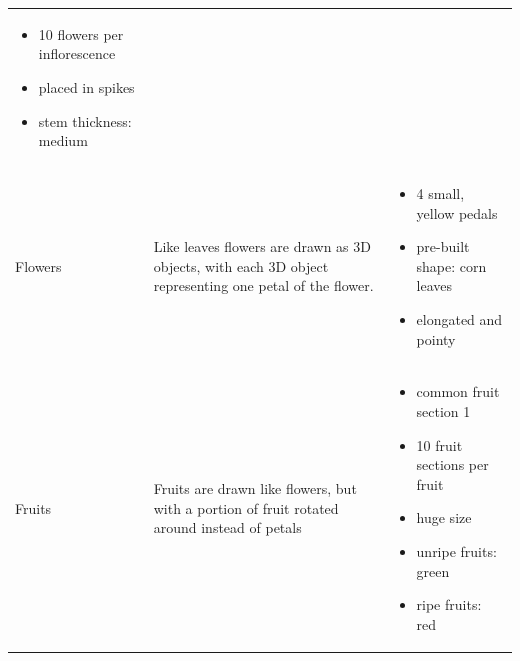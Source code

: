 \begin{longtable}[c]{@{}p{}p{}p{}@{}}
	\begin{itemize}
		\item 10 flowers per inflorescence\vspace{-10pt}
		\item placed in spikes\vspace{-10pt}
		\item stem thickness:  medium\vspace{-10pt}
	\end{itemize} \\
	Flowers                 & Like leaves flowers are drawn as 3D objects, with each 3D object representing one petal of the flower.                                                                                                                      & \vspace{-25pt}
	\begin{itemize}
		\item 4 small, yellow pedals\vspace{-10pt}
		\item pre-built shape: corn leaves\vspace{-10pt}
		\item elongated and pointy\vspace{-10pt}
	\end{itemize} \\
	Fruits   & Fruits are drawn like flowers, but with a portion of fruit rotated around instead of petals                                                                                                                                 & \vspace{-25pt}
	\begin{itemize}
		\item common fruit section 1\vspace{-10pt}
		\item 10 fruit sections per fruit\vspace{-10pt}
		\item huge size\vspace{-10pt}
		\item unripe fruits: green\vspace{-10pt}
		\item ripe fruits: red\vspace{-10pt}
	\end{itemize}
\\* \bottomrule
\end{longtable}
\pagebreak


